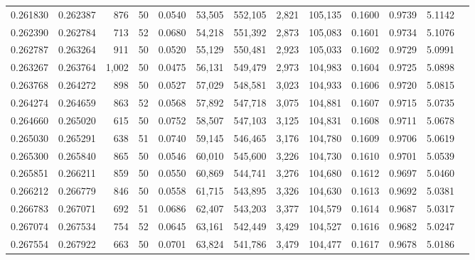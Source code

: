 \begin{tabular}{rrrrrrrrrrrrr}
0.261830 & 0.262387 &   876 &  50 &                                     0.0540 &  53,505 & 552,105 &   2,821 & 105,135 & 0.1600 & 0.9739 & 5.1142 \\
0.262390 & 0.262784 &   713 &  52 &                                     0.0680 &  54,218 & 551,392 &   2,873 & 105,083 & 0.1601 & 0.9734 & 5.1076 \\
0.262787 & 0.263264 &   911 &  50 &                                     0.0520 &  55,129 & 550,481 &   2,923 & 105,033 & 0.1602 & 0.9729 & 5.0991 \\
0.263267 & 0.263764 & 1,002 &  50 &                                     0.0475 &  56,131 & 549,479 &   2,973 & 104,983 & 0.1604 & 0.9725 & 5.0898 \\
0.263768 & 0.264272 &   898 &  50 &                                     0.0527 &  57,029 & 548,581 &   3,023 & 104,933 & 0.1606 & 0.9720 & 5.0815 \\
0.264274 & 0.264659 &   863 &  52 &                                     0.0568 &  57,892 & 547,718 &   3,075 & 104,881 & 0.1607 & 0.9715 & 5.0735 \\
0.264660 & 0.265020 &   615 &  50 &                                     0.0752 &  58,507 & 547,103 &   3,125 & 104,831 & 0.1608 & 0.9711 & 5.0678 \\
0.265030 & 0.265291 &   638 &  51 &                                     0.0740 &  59,145 & 546,465 &   3,176 & 104,780 & 0.1609 & 0.9706 & 5.0619 \\
0.265300 & 0.265840 &   865 &  50 &                                     0.0546 &  60,010 & 545,600 &   3,226 & 104,730 & 0.1610 & 0.9701 & 5.0539 \\
0.265851 & 0.266211 &   859 &  50 &                                     0.0550 &  60,869 & 544,741 &   3,276 & 104,680 & 0.1612 & 0.9697 & 5.0460 \\
0.266212 & 0.266779 &   846 &  50 &                                     0.0558 &  61,715 & 543,895 &   3,326 & 104,630 & 0.1613 & 0.9692 & 5.0381 \\
0.266783 & 0.267071 &   692 &  51 &                                     0.0686 &  62,407 & 543,203 &   3,377 & 104,579 & 0.1614 & 0.9687 & 5.0317 \\
0.267074 & 0.267534 &   754 &  52 &                                     0.0645 &  63,161 & 542,449 &   3,429 & 104,527 & 0.1616 & 0.9682 & 5.0247 \\
0.267554 & 0.267922 &   663 &  50 &                                     0.0701 &  63,824 & 541,786 &   3,479 & 104,477 & 0.1617 & 0.9678 & 5.0186 \\

\end{tabular}
